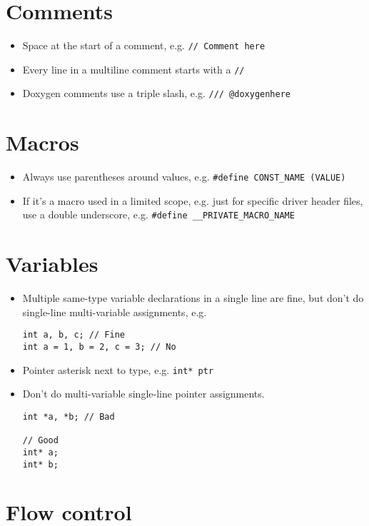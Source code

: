 \documentclass{article}
\begin{document}
\section{Comments}

\begin{itemize}
	\item Space at the start of a comment, e.g. \lstinline{// Comment here}
	\item Every line in a multiline comment starts with a \lstinline{//}
	\item Doxygen comments use a triple slash, e.g. \lstinline{/// @doxygenhere}
\end{itemize}

\section{Macros}

\begin{itemize}
	\item Always use parentheses around values, e.g. \lstinline{#define CONST_NAME (VALUE)}
	\item If it's a macro used in a limited scope, e.g. just for specific driver header files, use a double underscore, e.g. \lstinline{#define __PRIVATE_MACRO_NAME} 
\end{itemize}

\section{Variables}

\begin{itemize}
	\item Multiple same-type variable declarations in a single line are fine, but don't do single-line multi-variable assignments, e.g.
	\begin{lstlisting}
int a, b, c; // Fine
int a = 1, b = 2, c = 3; // No
	\end{lstlisting}

	\item Pointer asterisk next to type, e.g. \lstinline{int* ptr}
	\item Don't do multi-variable single-line pointer assignments.
	\begin{lstlisting}
int *a, *b; // Bad

// Good
int* a;
int* b;
	\end{lstlisting}
\end{itemize}

\section{Flow control}
\end{document}
